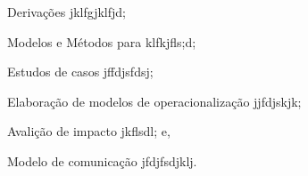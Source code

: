 \begin{list}{--}{}

    \item Derivações jklfgjklfjd;

    \item Modelos e Métodos para klfkjfls;d;

    \item Estudos de casos jffdjsfdsj;

    \item Elaboração de modelos de operacionalização jjfdjskjk;

    \item Avalição de impacto jkflsdl; e,

    \item Modelo de comunicação jfdjfsdjklj.

\end{list}